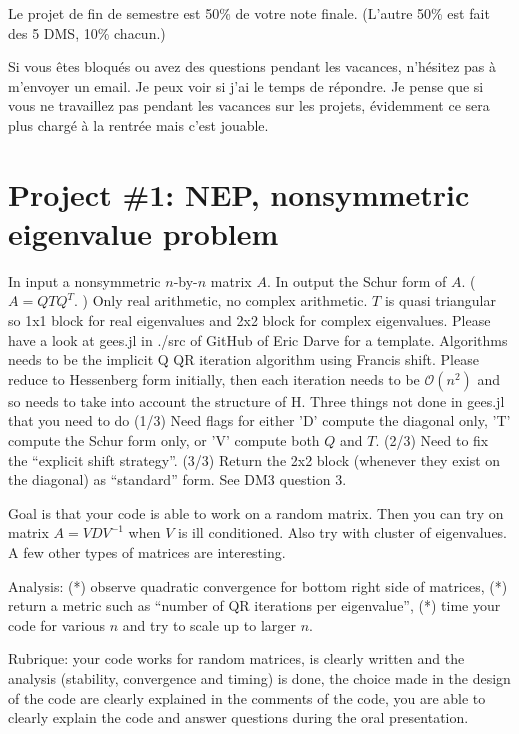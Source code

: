 \documentclass[11pt,letterpaper]{article}
\begin{document}
Le projet de fin de semestre est 50\% de votre note finale. (L’autre 50\% est
fait des 5 DMS, 10\% chacun.)
 
Si vous êtes bloqués ou avez des questions pendant les vacances, n’hésitez pas
à m’envoyer un email. Je peux voir si j’ai le temps de répondre. Je pense que
si vous ne travaillez pas pendant les vacances sur les projets, évidemment ce
sera plus chargé à la rentrée mais c’est jouable.
 
\section*{Project \#1: NEP, nonsymmetric eigenvalue problem}

In input a nonsymmetric $n$-by-$n$ matrix $A$. In output the Schur form of $A$.
( $A = Q T Q^T$. ) Only real arithmetic, no complex arithmetic. $T$ is quasi
triangular so 1x1 block for real eigenvalues and 2x2 block for complex
eigenvalues. Please have a look at gees.jl in ./src of GitHub of Eric Darve for
a template. Algorithms needs to be the implicit Q QR iteration algorithm using
Francis shift. Please reduce to Hessenberg form initially, then each iteration
needs to be $\mathcal{O}(n^2)$ and so needs to take into account the structure of H.
Three things not done in gees.jl that you need to do (1/3) Need flags for
either 'D' compute the diagonal only, 'T' compute the Schur form only, or 'V'
compute both $Q$ and $T$. (2/3) Need to fix the ``explicit shift strategy''.
(3/3) Return the 2x2 block (whenever they exist on the diagonal) as ``standard''
form. See DM3 question 3.

Goal is that your code is able to work on a random matrix. Then you can try on
matrix $A = VDV^{-1}$ when $V$ is ill conditioned. Also try with cluster of
eigenvalues. A few other types of matrices are interesting.

Analysis: (*) observe quadratic convergence for bottom right side of matrices,
(*) return a metric such as ``number of QR iterations per eigenvalue'', (*) time
your code for various $n$ and try to scale up to larger $n$.

Rubrique: your code works for random matrices, is clearly written
and the analysis (stability, convergence and timing) is done, the choice made
in the design of the code are clearly explained in the comments of the code, you are able to clearly 
explain the code and answer questions 
during the oral presentation.

\end{document}
